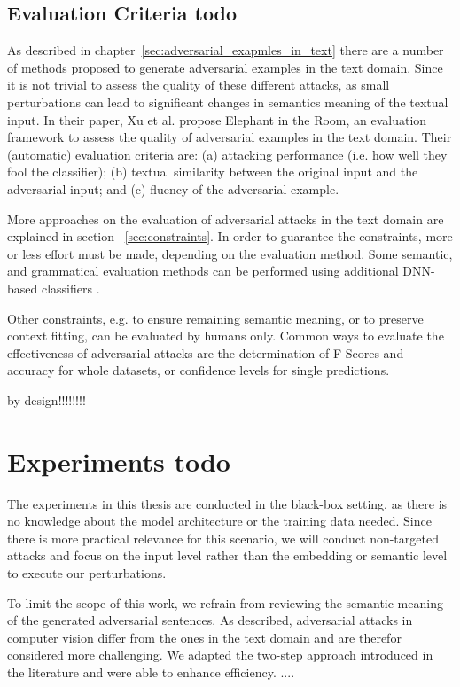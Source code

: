 \subsection{Evaluation Criteria todo}
    \label{sec:evaluation_tb}
As described in chapter~\ref{sec:adversarial_exapmles_in_text} there are a number of methods proposed to generate adversarial examples in the text domain. Since it is not trivial to assess the quality of these different attacks, as small perturbations can lead to significant changes in semantics meaning of the textual input. In their paper, Xu et al. propose Elephant in the Room, an evaluation framework to assess the quality of adversarial examples in the text domain\cite{xu2020elephant}. Their (automatic) evaluation criteria are:
(a) attacking performance (i.e. how well they fool the classifier); 
(b) textual similarity between the original input and the adversarial input; and
(c) fluency of the adversarial example.

More approaches on the evaluation of adversarial attacks in the text domain are explained in section ~\ref{sec:constraints}. In order to guarantee the constraints, more or less effort must be made, depending on the evaluation method. Some semantic, and grammatical evaluation methods can be performed using additional DNN-based classifiers \cite{ebrahimi2017hotflip, jin2019bert, garg2020bae}.

Other constraints, e.g. to ensure remaining semantic meaning, or to preserve context fitting, can be evaluated by humans only. 
Common ways to evaluate the effectiveness of adversarial attacks are the determination of F-Scores and accuracy for whole datasets, or confidence levels for single predictions. 

by design!!!!!!!!


\section{Experiments todo}
\label{sec:experiments}

The experiments in this thesis are conducted in the black-box setting, as there is no knowledge about the model architecture or the training data needed. Since there is more practical relevance for this scenario, we will conduct non-targeted attacks and focus on the input level rather than the embedding or semantic level to execute our perturbations. 

To limit the scope of this work, we refrain from reviewing the semantic meaning of the generated adversarial sentences.
As described, adversarial attacks in computer vision differ from the ones in the text domain and are therefor considered more challenging. We adapted the two-step approach introduced in the literature and were able to enhance efficiency. 
....

